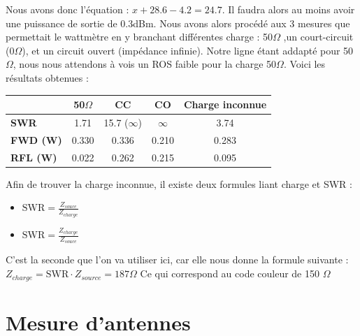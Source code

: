 \documentclass[a4paper,12pt]{report}            %
\begin{document}
Nous avons donc l'équation : $x+28.6-4.2=24.7$. Il faudra alors au moins avoir une puissance de sortie de 0.3dBm.
Nous avons alors procédé aux 3 mesures que permettait le wattmètre en y branchant différentes charge : 50$\Omega$ ,un court-circuit (0$\Omega$), et un circuit ouvert (impédance infinie).
Notre ligne étant addapté pour 50$\Omega$, nous nous attendons à vois un ROS faible pour la charge 50$\Omega$. Voici les 
résultats obtenues :

\begin{center}
	\begin{tabular}{||p{4cm}||*{4}{c|}|}
		\hline
		\bfseries         & 50$\Omega$ & CC              & CO       & Charge inconnue \\
		\hline
		\hline
		\bfseries SWR     & 1.71       & 15.7 ($\infty$) & $\infty$ & 3.74            \\
		\hline
		\bfseries FWD (W) & 0.330      & 0.336           & 0.210    & 0.283           \\
		\hline
		\bfseries RFL (W) & 0.022      & 0.262           & 0.215    & 0.095           \\
		\hline
		\hline
	\end{tabular}
\end{center}

Afin de trouver la charge inconnue, il existe deux formules liant charge et SWR :
\begin{itemize}
	\item $\mbox{SWR} = \frac{Z_{souce}}{Z_{charge}}$
	\item $\mbox{SWR} = \frac{Z_{charge}}{Z_{souce}}$
\end{itemize}

C'est la seconde que l'on va utiliser ici, car elle nous donne la formule suivante : 
$Z_{charge} = \mbox{SWR} \cdot Z_{source} = 187\Omega$
Ce qui correspond au code couleur de 150 $\Omega$


\chapter{Mesure d'antennes}
\end{document}
